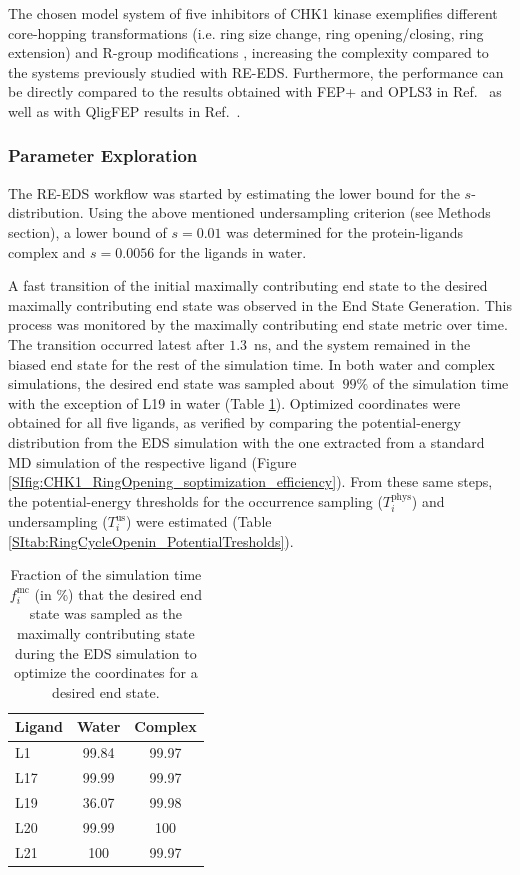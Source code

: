 The chosen model system of five inhibitors of CHK1 kinase exemplifies different core-hopping transformations (i.e. ring size change, ring opening/closing, ring extension) and R-group modifications \cite{Wang2017}, increasing the complexity compared to the systems previously studied with RE-EDS. Furthermore, the performance can be directly compared to the results obtained with FEP+ and OPLS3 in Ref.~\cite{Wang2017} as well as with QligFEP results in Ref.~\cite{Jespers2019}.

\subsubsection{Parameter Exploration}
The RE-EDS workflow was started by estimating the lower bound for the $s$-distribution. Using the above mentioned undersampling criterion (see Methods section), a lower bound of $s=0.01$ was determined for the protein-ligands complex and $s=0.0056$ for the ligands in water. 

A fast transition of the initial maximally contributing end state to the desired maximally contributing end state was observed in the End State Generation. This process was monitored by the maximally contributing end state metric over time.
The transition occurred latest after $1.3$~ns, and the system remained in the biased end state for the rest of the simulation time.
In both water and complex simulations, the desired end state was sampled about $~99\%$ of the simulation time with the exception of L19 in water (Table \ref{SItab:RingCycleOpenin_sampling_fraction_optimizedStates}).
Optimized coordinates were obtained for all five ligands, as verified by comparing the potential-energy distribution from the EDS simulation with the one extracted from a standard MD simulation of the respective ligand (Figure \ref{SIfig:CHK1_RingOpening_soptimization_efficiency}). 
From these same steps, the potential-energy thresholds for the occurrence sampling ($T_{i}^{\text{phys}}$) and undersampling ($T_{i}^{\text{us}}$) were estimated (Table \ref{SItab:RingCycleOpenin_PotentialTresholds}).

\begin{table}[H]
\centering
\caption{Fraction of the simulation time $f_i^{\text{mc}}$ (in \%) that the desired end state was sampled as the maximally contributing state during the EDS simulation to optimize the coordinates for a desired end state.}
\label{SItab:RingCycleOpenin_sampling_fraction_optimizedStates}
\begin{adjustbox}{max width=\textwidth}

\begin{tabular}{ l | c c }
 Ligand & Water  & Complex \\ 
 \hline
     L1 & 99.84 & 99.97 \\ 
     L17 & 99.99 & 99.97\\
     L19 & 36.07 &  99.98\\
     L20 & 99.99 & 100\\
     L21 & 100 & 99.97 \\
\end{tabular}
\end{adjustbox}
\end{table}


